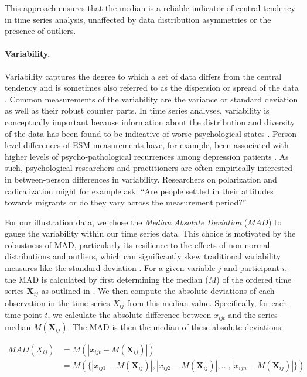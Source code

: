 This approach ensures that the median is a reliable indicator of central
tendency in time series analysis, unaffected by data distribution
asymmetries or the presence of outliers.

\paragraph{Variability.}

Variability captures the degree to which a set of data differs from the
central tendency and is sometimes also referred to as the dispersion or
spread of the data \citep{weisberg1992}. Common measurements of the
variability are the variance or standard deviation as well as their
robust counter parts. In time series analyses, variability is
conceptually important because information about the distribution and
diversity of the data has been found to be indicative of worse
psychological states \citep{myin-germeys2018, helmich2021}. Person-level
differences of ESM measurements have, for example, been associated with
higher levels of psycho-pathological recurrences among depression
patients \citep{timm2017}. As such, psychological researchers and
practitioners are often empirically interested in between-person
differences in variability. Researchers on polarization and
radicalization might for example ask: ``Are people settled in their
attitudes towards migrants or do they vary across the measurement
period?''

For our illustration data, we chose the
\textit{Median Absolute Deviation} (\(MAD\)) to gauge the variability
within our time series data. This choice is motivated by the robustness
of MAD, particularly its resilience to the effects of non-normal
distributions and outliers, which can significantly skew traditional
variability measures like the standard deviation \citep{weisberg1992}.
For a given variable \(j\) and participant \(i\), the MAD is calculated
by first determining the median (\(M\)) of the ordered time series
\(\mathbf{X}_{ij}\) as outlined in . We then compute
the absolute deviations of each observation in the time series
\(X_{ij}\) from this median value. Specifically, for each time point
\(t\), we calculate the absolute difference between \(x_{ijt}\) and the
series median \(M(\mathbf{X}_{ij})\). The MAD is then the median of
these absolute deviations:

\begin{subequations}\label{eq:mad}
    \begin{align} 
      MAD(X_{ij}) &= M(\left| x_{ijt} - M(\mathbf{X}_{ij}) \right|) \label{eq:mad_general} \\
                  &= M(\{ |x_{ij1} - M(\mathbf{X}_{ij})|, |x_{ij2} - M(\mathbf{X}_{ij})|, \ldots, |x_{ijn} - M(\mathbf{X}_{ij})| \}) \label{eq:mad_detailed}
    \end{align}
\end{subequations}

